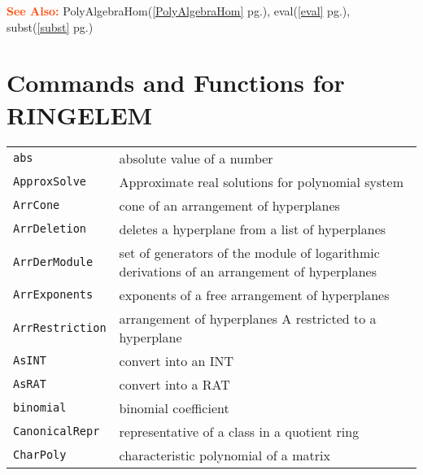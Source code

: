 \documentclass[a4paper]{mybook}
\newcommand\SeeAlso{\par\textcolor{OrangeRed}{\textbf{\large See Also: }}}
\begin{document}
\SeeAlso %
  PolyAlgebraHom(\ref{PolyAlgebraHom} pg.\pageref{PolyAlgebraHom}), 
    eval(\ref{eval} pg.\pageref{eval}), 
    subst(\ref{subst} pg.\pageref{subst})

\section{Commands and Functions for RINGELEM}
\label{Commands and Functions for RINGELEM}

        

\begin{center}
\begin{longtable}{ll}
   
{\verb~abs~} &
      absolute value of a number\\
   
{\verb~ApproxSolve~} &
      Approximate real solutions for polynomial system\\
   
{\verb~ArrCone~} &
      cone of an arrangement of hyperplanes\\
   
{\verb~ArrDeletion~} &
      deletes a hyperplane from a list of hyperplanes\\
   
{\verb~ArrDerModule~} &
      set of generators of the module of logarithmic derivations of an arrangement of hyperplanes\\
   
{\verb~ArrExponents~} &
      exponents of a free arrangement of hyperplanes\\
   
{\verb~ArrRestriction~} &
      arrangement of hyperplanes A restricted to a hyperplane\\
   
{\verb~AsINT~} &
      convert into an INT\\
   
{\verb~AsRAT~} &
      convert into a RAT\\
   
{\verb~binomial~} &
      binomial coefficient\\
   
{\verb~CanonicalRepr~} &
      representative of a class in a quotient ring\\
   
{\verb~CharPoly~} &
      characteristic polynomial of a matrix\\
   

\end{longtable}
\end{center}
\end{document}
